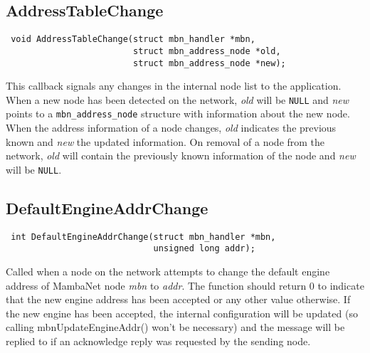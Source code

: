 \documentclass[a4paper]{report}
\begin{document}
\subsection{AddressTableChange}
\begin{verbatim}
 void AddressTableChange(struct mbn_handler *mbn,
                         struct mbn_address_node *old,
                         struct mbn_address_node *new);
\end{verbatim}
This callback signals any changes in the internal node list to the application. When a new node has been detected on the network, \textit{old} will be \verb|NULL| and \textit{new} points to a \verb|mbn_address_node| structure with information about the new node. When the address information of a node changes, \textit{old} indicates the previous known and \textit{new} the updated information. On removal of a node from the network, \textit{old} will contain the previously known information of the node and \textit{new} will be \verb|NULL|.


\subsection{DefaultEngineAddrChange}
\begin{verbatim}
 int DefaultEngineAddrChange(struct mbn_handler *mbn,
                             unsigned long addr);
\end{verbatim}
Called when a node on the network attempts to change the default engine address of MambaNet node \textit{mbn} to \textit{addr}. The function should return 0 to indicate that the new engine address has been accepted or any other value otherwise. If the new engine has been accepted, the internal configuration will be updated (so calling mbnUpdateEngineAddr() won't be necessary) and the message will be replied to if an acknowledge reply was requested by the sending node.
\end{document}
